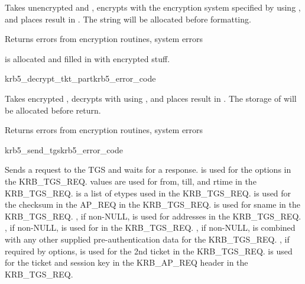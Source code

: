 \internalfunc

\begin{sloppypar}
Takes unencrypted  and
, encrypts with
the encryption system specified by  using
, and places result in 
.
The string  will be allocated
before formatting.
\end{sloppypar}

Returns errors from encryption routines, system errors

 is allocated and filled in with
encrypted stuff.

\begin{funcdecl}{krb5_decrypt_tkt_part}{krb5_error_code}{\funcinout}
\funcin
{}
\funcinout
{}
\end{funcdecl}

\internalfunc

Takes encrypted , decrypts with
using , and places result in
.  The storage of
 will be allocated before return.

Returns errors from encryption routines, system errors

\begin{funcdecl}{krb5_send_tgs}{krb5_error_code}{\funcinout}
\funcin
{}
\funcinout
{}
\funcout
{}
\end{funcdecl}

\internalfunc

Sends a request to the TGS and waits for a response.
 is used for the options in the KRB_TGS_REQ.
 values are used for from, till, and rtime in the
KRB_TGS_REQ.
 is a list of etypes used in the KRB_TGS_REQ.
 is used for the checksum in the AP_REQ in the KRB_TGS_REQ.
 is used for sname in the KRB_TGS_REQ.
, if non-NULL, is used for addresses in the KRB_TGS_REQ.
, if non-NULL, is used for
 in the KRB_TGS_REQ.  
, if non-NULL, is combined with any other supplied
pre-authentication data for the KRB_TGS_REQ.
, if required by options, is used for the 2nd
ticket in the KRB_TGS_REQ.
 is used for the ticket and session key in the KRB_AP_REQ header in the KRB_TGS_REQ.

